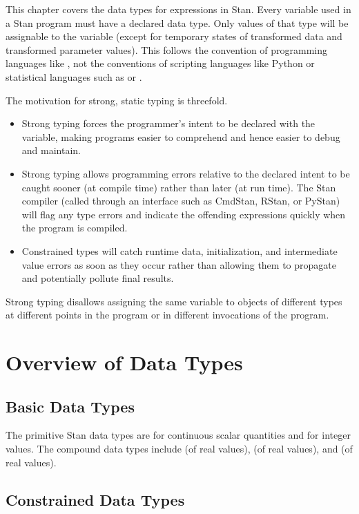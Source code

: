 \noindent 
This chapter covers the data types for expressions in Stan.  Every
variable used in a Stan program must have a declared data type.  Only
values of that type will be assignable to the variable (except for
temporary states of transformed data and transformed parameter
values).  This follows the convention of programming languages like
\Cpp, not the conventions of scripting languages like Python or
statistical languages such as \R or \BUGS.  

The motivation for strong, static typing is threefold.  
%
\begin{itemize}
\item Strong typing forces the programmer's intent to be declared with
  the variable, making programs easier to comprehend and hence easier
  to debug and maintain.
\item Strong typing allows programming errors relative to the declared
  intent to be caught sooner (at compile time) rather than later (at
  run time).  The Stan compiler (called through an interface such as
  CmdStan, RStan, or PyStan) will flag any type errors and indicate
  the offending expressions quickly when the program is compiled.
\item Constrained types will catch runtime data, initialization, and
  intermediate value errors as soon as they occur rather than allowing
  them to propagate and potentially pollute final results.
\end{itemize}
%
Strong typing disallows assigning the same variable to objects of
different types at different points in the program or in different
invocations of the program.

\section{Overview of Data Types}

\subsection{Basic Data Types}

The primitive Stan data types are  for continuous scalar
quantities and  for integer values.  The compound data
types include  (of real values),  (of
real values), and  (of real values).

\subsection{Constrained Data Types}

